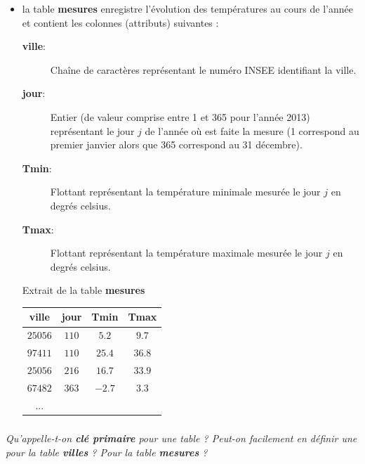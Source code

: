 \documentclass[10pt,fleqn]{article} %
\begin{document}
\begin{itemize}
		
		\item	la table \textbf{mesures} enregistre l'évolution des températures
		au cours de l'année et contient les colonnes (attributs) suivantes :
		
			\begin{description}
				\item[\textbf{ville}:] Chaîne de caractères représentant le numéro INSEE 
				identifiant la ville.
				
				\item[\textbf{jour}:] Entier (de valeur comprise entre 1 et 365 
				pour l'année 2013) représentant le jour $j$ de l'année où est 
				faite la mesure (1 correspond au premier janvier alors que 365 
				correspond au 31 décembre).
				
				\item[\textbf{Tmin}:] Flottant représentant la température 
				minimale mesurée le jour $j$ en degrés celsius.
				
				\item[\textbf{Tmax}:] Flottant représentant la température 
				maximale mesurée le jour $j$ en degrés celsius.
				
			\end{description}
		
\begin{exemple}
Extrait de la table \textbf{mesures}
\begin{center}\begin{tabular}{*{4}{c}}
\textbf{ville} & \textbf{jour} & \textbf{Tmin} & \textbf{Tmax} \\ \hline \hline
$$25056$$&$110$&$5.2$&$9.7$\\ 
$$97411$$&$110$&$25.4$&$36.8$\\ 
$$25056$$&$216$&$16.7$&$33.9$\\ 
$$67482$$&$363$&$-2.7$&$3.3$\\ 
...\end{tabular}\end{center}
\end{exemple}

	\end{itemize}


	
\subparagraph{} 	\textit{Qu'appelle-t-on \textbf{clé primaire} pour une table ? 
	Peut-on facilement en définir une pour la table \textbf{villes} ? 
	Pour la table \textbf{mesures} ?}
	
\end{document}
